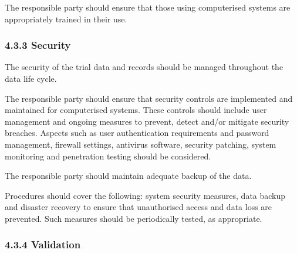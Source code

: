 \documentclass[11pt]{article}
\begin{document}
The responsible party should ensure that those using computerised systems are appropriately trained in their use.


\subsubsection{4.3.3 Security}

\begin{description}[leftmargin=2.5cm,style=sameline]

\item[(a)] The security of the trial data and records should be managed throughout the data life cycle.

\item[(b)] The responsible party should ensure that security controls are implemented and maintained for computerised systems. These controls should include user management and ongoing measures to prevent, detect and/or mitigate security breaches. Aspects such as user authentication requirements and password management, firewall settings, antivirus software, security patching, system monitoring and penetration testing should be considered.

\item[(c)] The responsible party should maintain adequate backup of the data.

\item[(d)] Procedures should cover the following: system security measures, data backup and disaster recovery to ensure that unauthorised access and data loss are prevented. Such measures should be periodically tested, as appropriate.

\end{description}

\subsubsection{4.3.4 Validation}
\end{document}
